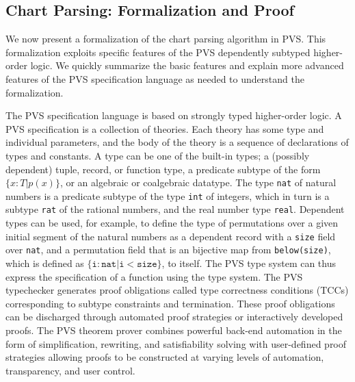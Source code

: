 \documentclass[sigplan,10pt,anonymous,review]{acmart}\settopmatter{printfolios=true,printccs=false,printacmref=false}
\begin{document}
\begin{CCSXML}








\section{Chart Parsing: Formalization and Proof}

We now present a formalization of the chart parsing algorithm in PVS.
This formalization exploits specific features of
the PVS dependently subtyped higher-order logic.  
We quickly summarize the basic features and 
explain more advanced  features of the PVS specification language
as needed to understand the formalization.  

The PVS specification language is based on strongly typed higher-order logic.  
A PVS specification is a collection of theories.  Each theory has
some type and individual parameters, and the body of the theory is a sequence
of declarations of types and constants.  A type can be one of the built-in
types; a (possibly dependent) tuple, record, or function type, a predicate
subtype of the form $\{x: T | p(x)\}$, or an algebraic or coalgebraic datatype.
The type \texttt{nat} of natural numbers is a predicate subtype of the
type \texttt{int} of integers, which in turn is a subtype \texttt{rat} of the
rational numbers, and the real number type \texttt{real}\@.  Dependent
types can be used, for example, to define the type of permutations over a
given initial segment of the natural numbers as a dependent record with a
\texttt{size} field over \texttt{nat}, and a permutation field that is an bijective
map from \texttt{below(size)}, which is defined as $\{\mathtt{i} : \mathtt{nat} | \mathtt{i} < \mathtt{size}\}$, to itself.  The PVS type system can thus express
the specification of a function using the type system.  
 The PVS typechecker generates proof obligations called type correctness conditions (TCCs) corresponding to subtype constraints and termination.  
These proof obligations can be discharged through automated proof strategies or interactively developed proofs.  The PVS theorem prover combines powerful back-end automation in the form of simplification, rewriting, and satisfiability solving with
user-defined proof strategies allowing proofs to be constructed at varying levels of automation, transparency, and user control.






\end{CCSXML}
\end{document}
